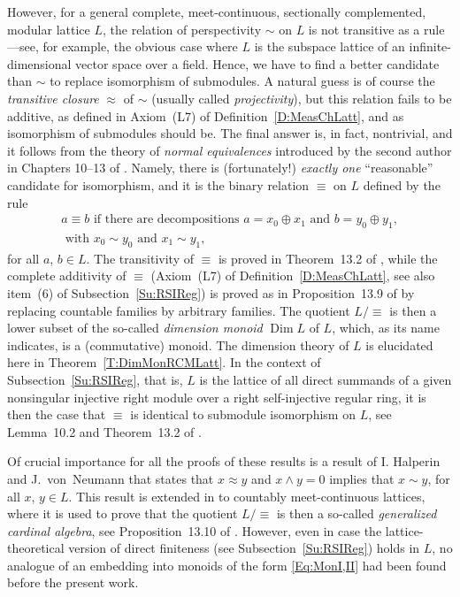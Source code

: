 \documentclass[psamsfonts,reqno]{memo-l}
\theoremstyle{plain}
\theoremstyle{definition}
\theoremstyle{remark}
\numberwithin{equation}{section}
\DeclareMathOperator{\Dim}{Dim}
\begin{document}
However, for a general complete, meet-continuous, sectionally complemented,
modular
lattice $L$, the relation of
perspectivity $\sim$ on $L$ is
not transitive as a rule---see, for example, the obvious case where $L$ is
the subspace lattice of an infinite-dimensional vector space over a field.
Hence, we have to find a better candidate than
$\sim$ to replace isomorphism of submodules. A natural guess is of course
the \emph{transitive closure} $\approx$ of $\sim$
(usually called \emph{projectivity}), but this relation
fails to be additive, as defined in Axiom~(L7) of
Definition~\ref{D:MeasChLatt}, and as isomorphism of submodules should be.
The final answer is, in fact, nontrivial, and it follows from the theory of
\emph{normal equivalences}
introduced by the second author in
Chapters 10--13 of \cite{WDim}. Namely, there is
(fortunately!)
\emph{exactly one} ``reasonable'' candidate for isomorphism, and it is the
binary relation $\equiv$ on $L$ defined by the rule
   \begin{multline*}
   a\equiv b\text{ if there are decompositions }a=x_0\oplus x_1\text{ and }
   b=y_0\oplus y_1,\\
   \text{ with }x_0\sim y_0\text{ and }x_1\sim y_1,
   \end{multline*}
for all $a$, $b\in L$.
The transitivity of $\equiv$ is proved in Theorem~13.2 of
\cite{WDim}, while the complete additivity of $\equiv$ (Axiom~(L7) of
Definition~\ref{D:MeasChLatt}, see also item~(6) of
Subsection~\ref{Su:RSIReg}) is proved as in Proposition~13.9
of \cite{WDim} by replacing countable families by
arbitrary families. The quotient
$L/{\equiv}$ is then a lower subset of the so-called \emph{dimension monoid}
 $\Dim L$\index{dzzimL@$\Dim L$}
of $L$, which, as its name indicates, is a (commutative) monoid.
The dimension theory of $L$ is elucidated here in
Theorem~\ref{T:DimMonRCMLatt}. In the context of
Subsection~\ref{Su:RSIReg}, that is, $L$ is the lattice of all direct
summands of a given nonsingular injective right module over a right
self-injective regular ring,
%
it is then the case that $\equiv$ is identical to submodule isomorphism on
$L$, see Lemma~10.2 and Theorem~13.2 of \cite{WDim}.

Of crucial importance for all the proofs of these results is
a result of I. Halperin and J.~von~Neumann \cite{HaNe40}
%
that states that
$x\approx y$ and $x\wedge y=0$ implies that $x\sim y$, for all $x$,
$y\in L$. This result is extended in \cite{WDim} to
countably meet-continuous lattices, where it is used to prove that the
quotient $L/{\equiv}$ is then a so-called \emph{generalized cardinal
algebra}, see Proposition~13.10 of
\cite{WDim}. However, even in case the lattice-theoretical version of
direct finiteness (see Subsection~\ref{Su:RSIReg}) holds in $L$, no
analogue of an embedding into monoids of the form \eqref{Eq:MonI,II} had been
found before the present work.
\end{document}
